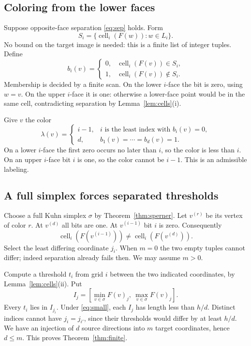 \documentclass[11pt,a4paper]{article}
\theoremstyle{definition}
\newcommand{\Cell}{\operatorname{cell}}
\begin{document}
\subsection{Coloring from the lower faces}
Suppose opposite-face separation \eqref{eq:sep} holds. Form
\[
        S_i=\{\Cell_i(F(w)):w\in L_i\}.
\]
No bound on the target image is needed: this is a finite list
of integer tuples. Define
\[
 b_i(v)=
 \begin{cases}
 0,&\Cell_i(F(v))\in S_i,\\
 1,&\Cell_i(F(v))\notin S_i.
 \end{cases}
\]
Membership is decided by a finite scan. On the lower $i$-face
the bit is zero, using $w=v$. On the upper $i$-face it is one:
otherwise a lower-face point would be in the same cell,
contradicting separation by Lemma~\ref{lem:cells}(i).

Give $v$ the color
\begin{equation}\label{eq:color}
 \lambda(v)=
 \begin{cases}
 i-1,&i\text{ is the least index with }b_i(v)=0,\\
 d,&b_1(v)=\cdots=b_d(v)=1.
 \end{cases}
\end{equation}
On a lower $i$-face the first zero occurs no later than $i$,
so the color is less than $i$. On an upper $i$-face bit $i$
is one, so the color cannot be $i-1$. This is an admissible
labeling.

\subsection{A full simplex forces separated thresholds}
Choose a full Kuhn simplex $\sigma$ by
Theorem~\ref{thm:sperner}. Let $v^{(r)}$ be its vertex of color
$r$. At $v^{(d)}$ all bits are one. At $v^{(i-1)}$ bit $i$
is zero. Consequently
\[
       \Cell_i(F(v^{(i-1)}))
       \ne \Cell_i(F(v^{(d)})).
\]
Select the least differing coordinate $j_i$. When $m=0$ the
two empty tuples cannot differ; indeed separation already
fails then. We may assume $m>0$.

Compute a threshold $t_i$ from grid $i$ between the two
indicated coordinates, by Lemma~\ref{lem:cells}(ii). Put
\[
 I_j=\left[\min_{v\in\sigma}F(v)_j,\
                  \max_{v\in\sigma}F(v)_j\right].
\]
Every $t_i$ lies in $I_{j_i}$. Under \eqref{eq:small}, each
$I_j$ has length less than $h/d$. Distinct indices cannot
have $j_i=j_{i'}$, since their thresholds would differ by at
least $h/d$. We have an injection of $d$ source directions
into $m$ target coordinates, hence $d\leq m$. This proves
Theorem~\ref{thm:finite}.
\end{document}
